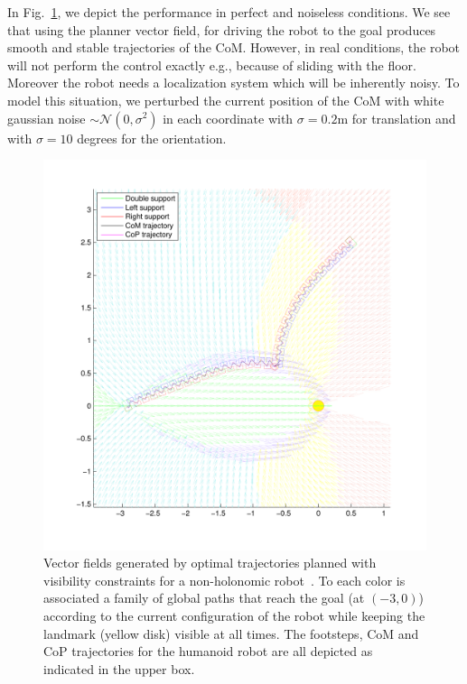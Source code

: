 In Fig.~\ref{fig:steps6}, we depict the performance in perfect and noiseless conditions. We see that using the planner vector field, for driving the robot to the goal produces smooth and stable trajectories of the CoM. However, in real conditions, the robot will not perform the control exactly e.g., because of sliding with the floor. Moreover the robot needs a localization system which will be inherently noisy. To model this situation, we perturbed the current position of the CoM with white gaussian noise $\sim \mathcal{N}(0,\sigma^2)$ in each coordinate with $\sigma = 0.2$m for translation and with $\sigma = 10$ degrees for the orientation.

\begin{figure}[ht]
\centering
\includegraphics[scale=0.8]{Chap5-Visual-Planning/steps6.pdf}
\caption{Vector fields generated by optimal trajectories planned with visibility constraints for a non-holonomic robot~\citep{Salaris:2010}. To each color is associated a family of global paths that reach the goal (at $(-3,0)$) according to the current configuration of the robot while keeping the landmark (yellow disk) visible at all times. The footsteps, CoM and CoP trajectories for the humanoid robot are all depicted as indicated in the upper box.}
\label{fig:steps6}
\end{figure}

